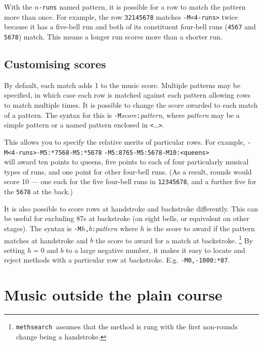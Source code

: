 \documentclass[a4paper,11pt,oneside]{book}
\def\methsearch{\texttt{meth\-search}}
\begin{document}
With the $n$\verb+-runs+ named pattern, it is possible for a row to match
the pattern more than once.  For example, the row \verb+32145678+ matches
\verb+-M<4-runs>+ twice because it has a five-bell run and both of its 
constituent four-bell runs (\verb+4567+ and \verb+5678+) match.  This means
a longer run scores more than a shorter run.

\subsection{Customising scores}\label{musscore}

By default, each match adds 1 to the music score.  Multiple patterns
may be specified, in which case each row is matched against each pattern
allowing rows to match multiple times.  It is possible to change the score
awarded to each match of a pattern.  The syntax for this is 
\verb+-M+\textit{score}\verb+:+\textit{pattern}, where \textit{pattern}
may be a simple pattern or a named pattern enclosed in \verb+<+\ldots\verb+>+.

This allows you to specify the relative merits of particular rows.  For 
example, \verb+-M<4-runs>+\hfill\verb+-M5:*7568+\hfill\verb+-M5:*5678+\hfill%
\verb+-M5:8765+\hfill\verb+-M5:5678+\hfill\verb+-M10:<queens>+\\
will award ten points to queens,
five points to each of four particularly musical types of runs, and one point
for other four-bell runs.  (As a result, rounds would score 10 --- one each
for the five four-bell runs in \verb+12345678+, and a further five for 
the \verb+5678+ at the back.)

It is also possible to score rows at handstroke and backstroke differently.
This can be useful for excluding 87s at backstroke (on eight bells, or 
equivalent on other stages).  The syntax is 
\verb+-M+$h$\verb+,+$b$\verb+:+\textit{pattern} where $h$ is the score
to award if the pattern matches at handstroke and 
$b$ the score to award for a match at backstroke.%
\footnote{\methsearch\ assumes that the method is rung with the first 
non-rounds change being a handstroke.}
By setting $h=0$ and $b$ to a large negative number, it makes it easy to locate
and reject methods with a particular row at backstroke.  E.g.
\verb+-M0,-1000:*87+.

\section{Music outside the plain course}\label{muswhere}
\end{document}
